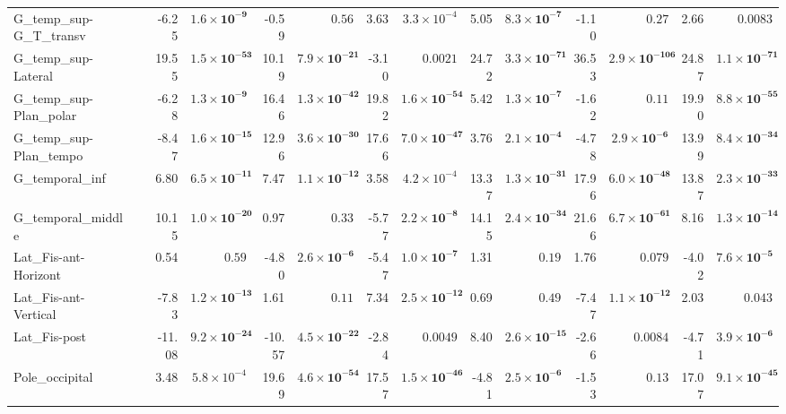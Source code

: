 {\begin{longtable}{llrrrrrrrrrrrr}
G\_temp\_sup-G\_T\_transv &  & -6.25 & $\mathbf{1.6{\times}10^{-9}}$ & -0.59 & $0.56$ & 3.63 & $3.3{\times}10^{-4}$ & 5.05 & $\mathbf{8.3{\times}10^{-7}}$ & -1.10 & $0.27$ & 2.66 & $0.0083$ \\
G\_temp\_sup-Lateral &  & 19.55 & $\mathbf{1.5{\times}10^{-53}}$ & 10.19 & $\mathbf{7.9{\times}10^{-21}}$ & -3.10 & $0.0021$ & 24.72 & $\mathbf{3.3{\times}10^{-71}}$ & 36.53 & $\mathbf{2.9{\times}10^{-106}}$ & 24.87 & $\mathbf{1.1{\times}10^{-71}}$ \\
G\_temp\_sup-Plan\_polar &  & -6.28 & $\mathbf{1.3{\times}10^{-9}}$ & 16.46 & $\mathbf{1.3{\times}10^{-42}}$ & 19.82 & $\mathbf{1.6{\times}10^{-54}}$ & 5.42 & $\mathbf{1.3{\times}10^{-7}}$ & -1.62 & $0.11$ & 19.90 & $\mathbf{8.8{\times}10^{-55}}$ \\
G\_temp\_sup-Plan\_tempo &  & -8.47 & $\mathbf{1.6{\times}10^{-15}}$ & 12.96 & $\mathbf{3.6{\times}10^{-30}}$ & 17.66 & $\mathbf{7.0{\times}10^{-47}}$ & 3.76 & $\mathbf{2.1{\times}10^{-4}}$ & -4.78 & $\mathbf{2.9{\times}10^{-6}}$ & 13.99 & $\mathbf{8.4{\times}10^{-34}}$ \\
G\_temporal\_inf &  & 6.80 & $\mathbf{6.5{\times}10^{-11}}$ & 7.47 & $\mathbf{1.1{\times}10^{-12}}$ & 3.58 & $4.2{\times}10^{-4}$ & 13.37 & $\mathbf{1.3{\times}10^{-31}}$ & 17.96 & $\mathbf{6.0{\times}10^{-48}}$ & 13.87 & $\mathbf{2.3{\times}10^{-33}}$ \\
G\_temporal\_middle &  & 10.15 & $\mathbf{1.0{\times}10^{-20}}$ & 0.97 & $0.33$ & -5.77 & $\mathbf{2.2{\times}10^{-8}}$ & 14.15 & $\mathbf{2.4{\times}10^{-34}}$ & 21.66 & $\mathbf{6.7{\times}10^{-61}}$ & 8.16 & $\mathbf{1.3{\times}10^{-14}}$ \\
Lat\_Fis-ant-Horizont &  & 0.54 & $0.59$ & -4.80 & $\mathbf{2.6{\times}10^{-6}}$ & -5.47 & $\mathbf{1.0{\times}10^{-7}}$ & 1.31 & $0.19$ & 1.76 & $0.079$ & -4.02 & $\mathbf{7.6{\times}10^{-5}}$ \\
Lat\_Fis-ant-Vertical &  & -7.83 & $\mathbf{1.2{\times}10^{-13}}$ & 1.61 & $0.11$ & 7.34 & $\mathbf{2.5{\times}10^{-12}}$ & 0.69 & $0.49$ & -7.47 & $\mathbf{1.1{\times}10^{-12}}$ & 2.03 & $0.043$ \\
Lat\_Fis-post &  & -11.08 & $\mathbf{9.2{\times}10^{-24}}$ & -10.57 & $\mathbf{4.5{\times}10^{-22}}$ & -2.84 & $0.0049$ & 8.40 & $\mathbf{2.6{\times}10^{-15}}$ & -2.66 & $0.0084$ & -4.71 & $\mathbf{3.9{\times}10^{-6}}$ \\
Pole\_occipital &  & 3.48 & $5.8{\times}10^{-4}$ & 19.69 & $\mathbf{4.6{\times}10^{-54}}$ & 17.57 & $\mathbf{1.5{\times}10^{-46}}$ & -4.81 & $\mathbf{2.5{\times}10^{-6}}$ & -1.53 & $0.13$ & 17.07 & $\mathbf{9.1{\times}10^{-45}}$ \\

\end{longtable}}
